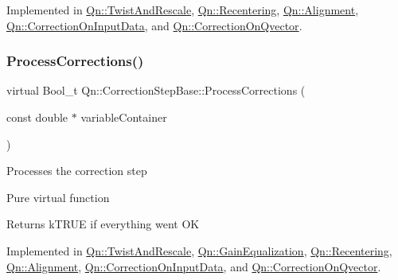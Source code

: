 Implemented in \mbox{\hyperlink{classQn_1_1TwistAndRescale_a82b3138efce50ea788122dd26ca964d7}{Qn\+::\+Twist\+And\+Rescale}}, \mbox{\hyperlink{classQn_1_1Recentering_a3849efa27b2827a2f307a100bc046916}{Qn\+::\+Recentering}}, \mbox{\hyperlink{classQn_1_1Alignment_aaa38151d72ebf1aa97247ba07c4d16e5}{Qn\+::\+Alignment}}, \mbox{\hyperlink{classQn_1_1CorrectionOnInputData_a738e13f0a496811358ad3f5b86320ffa}{Qn\+::\+Correction\+On\+Input\+Data}}, and \mbox{\hyperlink{classQn_1_1CorrectionOnQvector_a4d47a1c241b4bfd5ac98d6fdbc90eb79}{Qn\+::\+Correction\+On\+Qvector}}.

\mbox{\label{classQn_1_1CorrectionStepBase_a773ff3bbe5e7c8bcfb11a4f4138af1e1}} 
\subsubsection{\texorpdfstring{Process\+Corrections()}{ProcessCorrections()}}
{\footnotesize\ttfamily virtual Bool\+\_\+t Qn\+::\+Correction\+Step\+Base\+::\+Process\+Corrections (\begin{DoxyParamCaption}\item[{const double $\ast$}]{variable\+Container }\end{DoxyParamCaption})\hspace{0.3cm}{\ttfamily [pure virtual]}}

Processes the correction step

Pure virtual function \begin{DoxyReturn}{Returns}
k\+T\+R\+UE if everything went OK 
\end{DoxyReturn}


Implemented in \mbox{\hyperlink{classQn_1_1TwistAndRescale_a3bc16721deb0f73dbfcf0ae6cabe5b54}{Qn\+::\+Twist\+And\+Rescale}}, \mbox{\hyperlink{classQn_1_1GainEqualization_ade22bc9b3aee596b6594d8a8d6fdc1f1}{Qn\+::\+Gain\+Equalization}}, \mbox{\hyperlink{classQn_1_1Recentering_a78bd432f4eb1f13cf846176426dbe579}{Qn\+::\+Recentering}}, \mbox{\hyperlink{classQn_1_1Alignment_a57b815d9ce4d0ae4f94ff6cb46eb2514}{Qn\+::\+Alignment}}, \mbox{\hyperlink{classQn_1_1CorrectionOnInputData_a42390a6c47f558faeb1e14d245dcbc4a}{Qn\+::\+Correction\+On\+Input\+Data}}, and \mbox{\hyperlink{classQn_1_1CorrectionOnQvector_a2c2d7f0e48471fb9269f0b5f9aa3e836}{Qn\+::\+Correction\+On\+Qvector}}.


